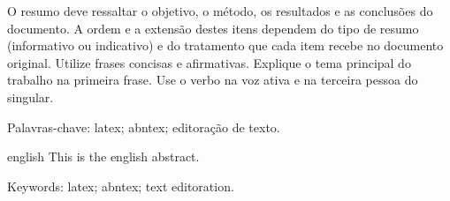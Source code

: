 \setlength{\absparsep}{18pt} 


\begin{resumo}
    O resumo deve ressaltar o objetivo, o método, os resultados e as conclusões do documento. A ordem e a extensão destes itens dependem do tipo de resumo (informativo ou indicativo) e do tratamento que cada item recebe no documento original. Utilize frases concisas e afirmativas. Explique o tema principal do trabalho na primeira frase. Use o verbo na voz ativa e na terceira pessoa do singular. 
    
    Palavras-chave: latex; abntex; editoração de texto.
\end{resumo}



\begin{resumo}[Abstract]
\begin{otherlanguage*}{english}
    This is the english abstract.
\vspace{\onelineskip}

\noindent 
Keywords: latex; abntex; text editoration.
\end{otherlanguage*}
\end{resumo}
